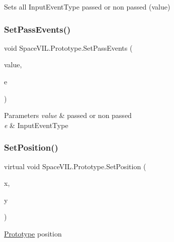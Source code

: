 Sets all Input\+Event\+Type passed or non passed (value) 

\mbox{\label{class_space_v_i_l_1_1_prototype_a412b7eb2ed5ee06834127b06aa04a1fd}} 
\subsubsection{\texorpdfstring{Set\+Pass\+Events()}{SetPassEvents()}\hspace{0.1cm}{\footnotesize\ttfamily [2/2]}}
{\footnotesize\ttfamily void Space\+V\+I\+L.\+Prototype.\+Set\+Pass\+Events (\begin{DoxyParamCaption}\item[{bool}]{value,  }\item[{Input\+Event\+Type}]{e }\end{DoxyParamCaption})}


\begin{DoxyParams}{Parameters}
{\em value} & passed or non passed \\
\hline
{\em e} & Input\+Event\+Type \\
\hline
\end{DoxyParams}
\mbox{\label{class_space_v_i_l_1_1_prototype_a85ca4db19baa118edbb48eb93302a6b3}} 
\subsubsection{\texorpdfstring{Set\+Position()}{SetPosition()}}
{\footnotesize\ttfamily virtual void Space\+V\+I\+L.\+Prototype.\+Set\+Position (\begin{DoxyParamCaption}\item[{int}]{x,  }\item[{int}]{y }\end{DoxyParamCaption})\hspace{0.3cm}{\ttfamily [virtual]}}



\mbox{\hyperlink{class_space_v_i_l_1_1_prototype}{Prototype}} position 


